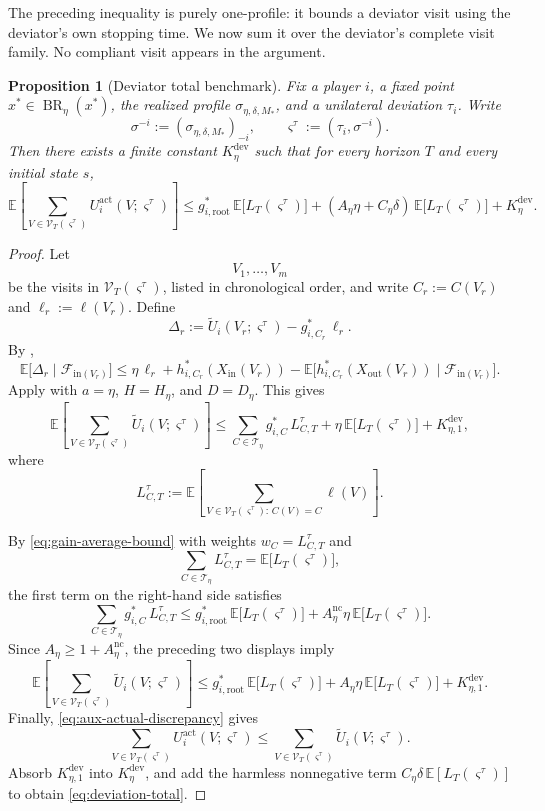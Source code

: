 \documentclass[12pt]{article}
\newtheorem{proposition}[theorem]{Proposition}
\theoremstyle{definition}
\newcommand{\E}{\mathbb{E}}
\newcommand{\1}{\mathbf{1}}
\newcommand{\cF}{\mathcal{F}}
\newcommand{\cT}{\mathcal{T}}
\DeclareMathOperator{\BR}{BR}
\begin{document}
The preceding inequality is purely one-profile: it bounds a deviator visit using
the deviator's own stopping time. We now sum it over the deviator's complete
visit family. No compliant visit appears in the argument.

\begin{proposition}[Deviator total benchmark]
\label{prop:deviation-total}
Fix a player $i$, a fixed point $x^*\in\BR_\eta(x^*)$, the realized profile
$\sigma_{\eta,\delta,M_*}$, and a unilateral deviation $\tau_i$. Write
\[
\sigma^{-i}:=(\sigma_{\eta,\delta,M_*})_{-i},
\qquad
\varsigma^\tau:=(\tau_i,\sigma^{-i}).
\]
Then there exists a finite constant $K_\eta^{\mathrm{dev}}$ such that for every
horizon $T$ and every initial state $s$,
\begin{equation}
\label{eq:deviation-total}
\E\left[
\sum_{V\in\mathcal V_T(\varsigma^\tau)}
U_i^{\mathrm{act}}(V;\varsigma^\tau)
\right]
\le
g_{i,\mathrm{root}}^*\,
\E\bigl[L_T(\varsigma^\tau)\bigr]
+
(A_\eta\eta+C_\eta\delta)\,
\E\bigl[L_T(\varsigma^\tau)\bigr]
+
K_\eta^{\mathrm{dev}}.
\end{equation}
\end{proposition}

\begin{proof}
Let
\[
V_1,\dots,V_m
\]
be the visits in $\mathcal V_T(\varsigma^\tau)$, listed in chronological order,
and write $C_r:=C(V_r)$ and $\ell_r:=\ell(V_r)$. Define
\[
\Delta_r
:=
\widetilde U_i(V_r;\varsigma^\tau)-g_{i,C_r}^*\,\ell_r.
\]
By ,
\[
\E\bigl[\Delta_r\mid\cF_{\mathrm{in}(V_r)}\bigr]
\le
\eta\,\ell_r
+
h_{i,C_r}^*(X_{\mathrm{in}}(V_r))
-
\E\bigl[h_{i,C_r}^*(X_{\mathrm{out}}(V_r))\mid\cF_{\mathrm{in}(V_r)}\bigr].
\]
Apply  with $a=\eta$, $H=H_\eta$, and $D=D_\eta$. This
gives
\[
\E\left[
\sum_{V\in\mathcal V_T(\varsigma^\tau)}
\widetilde U_i(V;\varsigma^\tau)
\right]
\le
\sum_{C\in\cT_\eta} g_{i,C}^*\,L_{C,T}^\tau
+
\eta\,\E\bigl[L_T(\varsigma^\tau)\bigr]
+
K_{\eta,1}^{\mathrm{dev}},
\]
where
\[
L_{C,T}^\tau
:=
\E\left[
\sum_{V\in\mathcal V_T(\varsigma^\tau):\,C(V)=C}\ell(V)
\right].
\]

By \eqref{eq:gain-average-bound} with weights $w_C=L_{C,T}^\tau$ and
\[
\sum_{C\in\cT_\eta}L_{C,T}^\tau=\E\bigl[L_T(\varsigma^\tau)\bigr],
\]
the first term on the right-hand side satisfies
\[
\sum_{C\in\cT_\eta} g_{i,C}^*\,L_{C,T}^\tau
\le
g_{i,\mathrm{root}}^*\,\E\bigl[L_T(\varsigma^\tau)\bigr]
+
A_\eta^{\mathrm{nc}}\eta\,\E\bigl[L_T(\varsigma^\tau)\bigr].
\]
Since $A_\eta\ge 1+A_\eta^{\mathrm{nc}}$, the preceding two displays imply
\[
\E\left[
\sum_{V\in\mathcal V_T(\varsigma^\tau)}
\widetilde U_i(V;\varsigma^\tau)
\right]
\le
g_{i,\mathrm{root}}^*\,\E\bigl[L_T(\varsigma^\tau)\bigr]
+
A_\eta\eta\,\E\bigl[L_T(\varsigma^\tau)\bigr]
+
K_{\eta,1}^{\mathrm{dev}}.
\]
Finally, \eqref{eq:aux-actual-discrepancy} gives
\[
\sum_{V\in\mathcal V_T(\varsigma^\tau)}
U_i^{\mathrm{act}}(V;\varsigma^\tau)
\le
\sum_{V\in\mathcal V_T(\varsigma^\tau)}
\widetilde U_i(V;\varsigma^\tau).
\]
Absorb $K_{\eta,1}^{\mathrm{dev}}$ into $K_\eta^{\mathrm{dev}}$, and add the
harmless nonnegative term
$C_\eta\delta\,\E[L_T(\varsigma^\tau)]$ to obtain
\eqref{eq:deviation-total}.
\end{proof}
\end{document}
